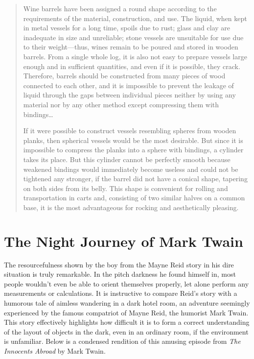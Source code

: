 \begin{quote}
Wine barrels have been assigned a round shape according to the requirements of the material, construction, and use. The liquid, when kept in metal vessels for a long time, spoils due to rust; glass and clay are inadequate in size and unreliable; stone vessels are unsuitable for use due to their weight—thus, wines remain to be poured and stored in wooden barrels. From a single whole log, it is also not easy to prepare vessels large enough and in sufficient quantities, and even if it is possible, they crack. Therefore, barrels should be constructed from many pieces of wood connected to each other, and it is impossible to prevent the leakage of liquid through the gaps between individual pieces neither by using any material nor by any other method except compressing them with bindings\dots{}

If it were possible to construct vessels resembling spheres from wooden planks, then spherical vessels would be the most desirable. But since it is impossible to compress the planks into a sphere with bindings, a cylinder takes its place. But this cylinder cannot be perfectly smooth because weakened bindings would immediately become useless and could not be tightened any stronger, if the barrel did not have a conical shape, tapering on both sides from its belly. This shape is convenient for rolling and transportation in carts and, consisting of two similar halves on a common base, it is the most advantageous for rocking and aesthetically pleasing.
\end{quote}

\section{The Night Journey of Mark Twain}
\label{sec-8.6}

The resourcefulness shown by the boy from the Mayne Reid story in his dire situation is truly remarkable. In the pitch darkness he found himself in, most people wouldn't even be able to orient themselves properly, let alone perform any measurements or calculations. It is instructive to compare Reid's story with a humorous tale of aimless wandering in a dark hotel room, an adventure seemingly experienced by the famous compatriot of Mayne Reid, the humorist Mark Twain. This story effectively highlights how difficult it is to form a correct understanding of the layout of objects in the dark, even in an ordinary room, if the environment is unfamiliar. Below is a condensed rendition of this amusing episode from \emph{The Innocents Abroad} by Mark Twain.

